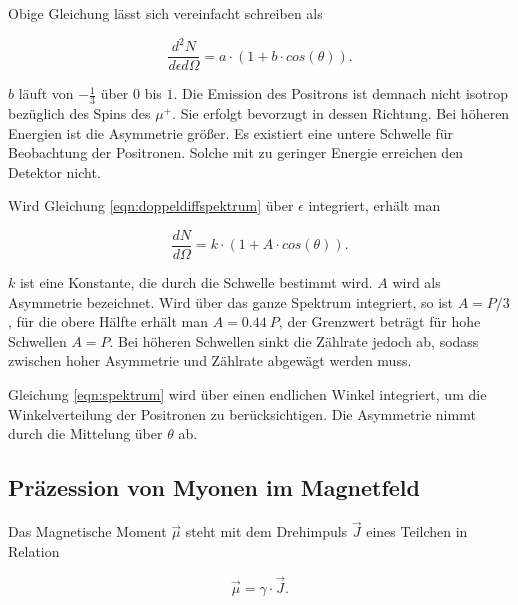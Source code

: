 \documentclass[a4paper,ngerman]{scrartcl}
\begin{document}
Obige Gleichung lässt sich vereinfacht schreiben als

\begin{equation}
\frac{d^2N}{d\epsilon d\Omega} = a \cdot (1 + b \cdot cos(\theta) ) .
\end{equation}

$b$ läuft von $-\frac{1}{3}$ über $0$ bis $1$. Die Emission des Positrons ist demnach nicht isotrop bezüglich des Spins des $\mu^{+}$. Sie erfolgt bevorzugt in dessen Richtung. Bei höheren Energien ist die Asymmetrie größer. Es existiert eine untere Schwelle für Beobachtung der Positronen. Solche mit zu geringer Energie erreichen den Detektor nicht. 

Wird Gleichung \ref{eqn:doppeldiffspektrum} über $\epsilon$ integriert, erhält man

\begin{equation}
\label{eqn:spektrum}
\frac{dN}{ d\Omega} = k \cdot (1 + A \cdot cos(\theta) ).
\end{equation}

$k$ ist eine Konstante, die durch die Schwelle bestimmt wird. $A$ wird als Asymmetrie bezeichnet. Wird über das ganze Spektrum integriert, so ist $A=P/3$, für die obere Hälfte erhält man $A = 0.44 \ P$, der Grenzwert beträgt für hohe Schwellen $A=P$. Bei höheren Schwellen sinkt die Zählrate jedoch ab, sodass zwischen hoher Asymmetrie und Zählrate abgewägt werden muss.

Gleichung \ref{eqn:spektrum} wird über einen endlichen Winkel integriert, um die Winkelverteilung der Positronen zu berücksichtigen. Die Asymmetrie nimmt durch die Mittelung über $\theta$ ab.







\subsection{Präzession von Myonen im Magnetfeld}
\label{sec:prazission}

Das Magnetische Moment $\vec{\mu}$ steht mit dem Drehimpuls $\vec{J}$ eines Teilchen in Relation

\begin{equation}
\vec{\mu} = \gamma \cdot \vec{J} .
\end{equation}
\end{document}
